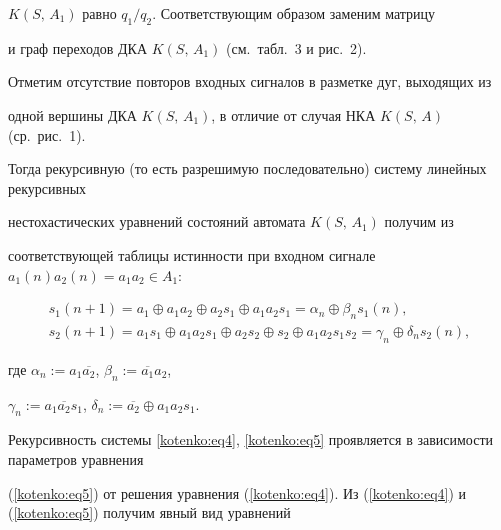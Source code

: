 $K(S,\,A_1)$ равно $q_1/q_2$. Соответствующим образом заменим матрицу

и граф переходов ДКА $K(S,\,A_1)$ (см.~табл.~3 и рис.~2).









Отметим отсутствие повторов входных сигналов в разметке дуг, выходящих из

одной вершины ДКА $K(S,\,A_1)$, в отличие от случая НКА $K(S,\,A)$ (ср.~рис.~1).




%






Тогда рекурсивную (то есть разрешимую последовательно) систему линейных рекурсивных

нестохастических уравнений состояний автомата $K(S,\,A_1)$ получим из

соответствующей таблицы истинности при входном сигнале \linebreak $a_1 (n)a_2 (n)=a_1 a_2 \in A_1$:

\begin{gather}

\label{kotenko:eq4}

s_1 (n+1)=a_1 \oplus a_1 a_2 \oplus a_2 s_1 \oplus a_1 a_2 s_1 =\alpha_n \oplus \beta _n s_1 ( n ),\\

\label{kotenko:eq5}

s_2 (n+1)=a_1 s_1 \oplus a_1 a_2 s_1 \oplus a_2 s_2 \oplus s_2 \oplus a_1

a_2 s_1 s_2 =\gamma _n \oplus \delta _n s_2 ( n ),

\end{gather}

где $\alpha _n :=a_1 \overline {a_2 }$, $\beta _n :=\overline {a_1 } a_2 $,

$\gamma _n :=a_1 \overline {a_2 } s_1 $, $\delta _n :=\overline {a_2 }

\oplus a_1 a_2 s_1 $.



Рекурсивность системы \eqref{kotenko:eq4}, \eqref{kotenko:eq5} проявляется в зависимости параметров уравнения

(\ref{kotenko:eq5}) от решения уравнения (\ref{kotenko:eq4}). Из (\ref{kotenko:eq4}) и (\ref{kotenko:eq5}) получим явный вид уравнений

